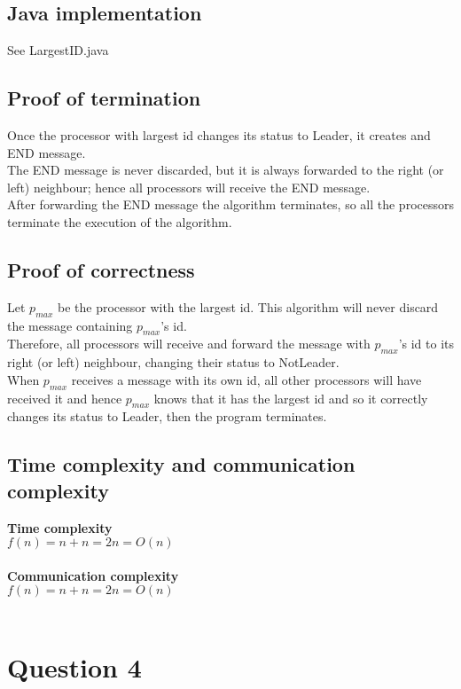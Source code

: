 \documentclass[12pt,letterpaper]{article}
\begin{document}
\subsection* {Java implementation}
See LargestID.java
\subsection* {Proof of termination}
Once the processor with largest id changes its status to Leader, it creates and END message. \\
The END message is never discarded, but it is always forwarded to the right (or left) neighbour; hence all processors will receive the END message. \\
After forwarding the END message the algorithm terminates, so all the processors terminate the execution of the algorithm.
\subsection* {Proof of correctness}
Let $p_{max}$ be the processor with the largest id. This algorithm will never discard the message containing $p_{max}$'s id. \\
Therefore, all processors will receive and forward the message with $p_{max}$'s id to its right (or left) neighbour, changing their status to NotLeader. \\
When $p_{max}$ receives a message with its own id, all other processors will have received it and hence $p_{max}$ knows that it has the largest id and so it correctly changes its status to Leader, then the program terminates.\\
\subsection* {Time complexity and communication complexity}
\textbf{Time complexity} \\
$f(n) = n + n = 2n = O(n)$ \\ \\
\textbf{Communication complexity} \\
$f(n) = n + n = 2n = O(n)$ \\ \\
\newpage
\section*{Question 4}
\end{document}
